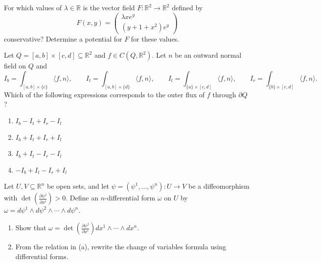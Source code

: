\begin{exercise}
\label{ex:12.5}
For which values of $\lambda \in \mathbb{R}$ is the vector field $F : \mathbb{R}^2 \to
\mathbb{R}^2$ defined by
\[F(x,y) = \begin{pmatrix} \lambda x e^y \\ (y+1+x^2)e^y \end{pmatrix}\]
conservative? Determine a potential for $F$ for these values.
\end{exercise}

\begin{exercise}
\label{ex:12.8}
Let $Q = [a,b]\times[c,d] \subseteq \mathbb{R}^2$ and $f \in C(Q,\mathbb{R}^2)$. Let $n$ be an
outward normal field on $Q$ and
\[I_b = \int_{[a,b]\times\{c\}} \langle f,n\rangle, \qquad I_t = \int_{[a,b]\times\{d\}}
  \langle f,n\rangle, \qquad I_l = \int_{\{a\}\times[c,d]} \langle f,n\rangle, \qquad
  I_r = \int_{\{b\}\times[c,d]} \langle f,n\rangle.\]
Which of the following expressions corresponds to the outer flux of $f$ through $\partial Q$?
\begin{enumerate}[label=\textbf{(\alph*)}]
  \item $I_b - I_t + I_r - I_l$
  \item $I_b + I_t + I_r + I_l$
  \item $I_b + I_t - I_r - I_l$
  \item $-I_b + I_t - I_r + I_l$
\end{enumerate}
\end{exercise}

\begin{exercise}
\label{ex:12.9}
Let $U,V \subseteq \mathbb{R}^n$ be open sets, and let $\psi = (\psi^1,\ldots,\psi^n) : U \to
V$ be a diffeomorphism with $\det\!\left(\frac{\partial\psi^j}{\partial x^i}\right) > 0$.
Define an $n$-differential form $\omega$ on $U$ by $\omega = d\psi^1\wedge d\psi^2\wedge\cdots
\wedge d\psi^n$.
\begin{enumerate}[label=\textbf{(\alph*)}]
  \item Show that $\omega = \det\!\left(\frac{\partial\psi^j}{\partial x^i}\right) dx^1\wedge
  \cdots\wedge dx^n$.
  \item From the relation in (a), rewrite the change of variables formula using differential
  forms.
\end{enumerate}
\end{exercise}

